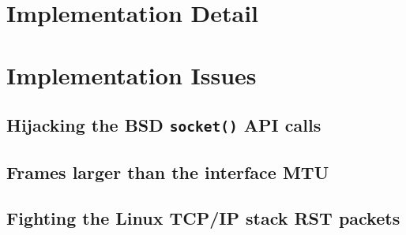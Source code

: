 \documentclass[11pt,a4paper,british]{bhamarticle}
\begin{document}
\section{Implementation Detail}





\section{Implementation Issues}
\subsection{Hijacking the BSD \texttt{socket()} API calls} %

\subsection{Frames larger than the interface MTU}

\subsection{Fighting the Linux TCP/IP stack RST packets}
\end{document}
